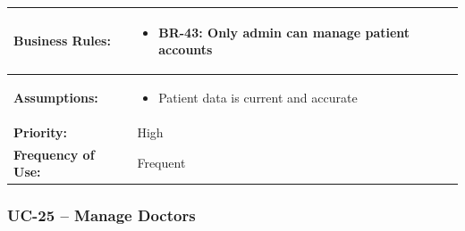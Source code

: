 \documentclass[12pt,a4paper]{article}
\begin{document}
\begin{longtable}{|p{4.5cm}|p{10.5cm}|}
\hline
\textbf{Business Rules:} &
\begin{itemize}
  \item BR-43: Only admin can manage patient accounts
\end{itemize} \\
\hline
\textbf{Assumptions:} &
\begin{itemize}
  \item Patient data is current and accurate
\end{itemize} \\
\hline
\textbf{Priority:} & High \\
\hline
\textbf{Frequency of Use:} & Frequent \\
\hline
\end{longtable}

\subsubsection{UC-25 – Manage Doctors}
\end{document}
